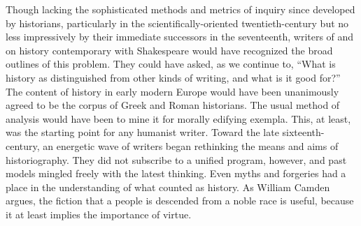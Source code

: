 Though lacking the sophisticated methods and metrics of inquiry since developed by historians, particularly in the scientifically-oriented twentieth-century but no less impressively by their immediate successors in the seventeenth, writers of and on history contemporary with Shakespeare would have recognized the broad outlines of this problem. They could have asked, as we continue to, ``What is history as distinguished from other kinds of writing, and what is it good for?'' The content of history in early modern Europe would have been unanimously agreed to be the corpus of Greek and Roman historians. The usual method of analysis would have been to mine it for morally edifying exempla. This, at least, was the starting point for any humanist writer. Toward the late sixteenth-century, an energetic wave of writers began rethinking the means and aims of historiography. They did not subscribe to a unified program, however, and past models mingled freely with the latest thinking. Even myths and forgeries had a place in the understanding of what counted as history. As William Camden argues, the fiction that a people is descended from a noble race is useful, because it at least implies the importance of virtue.

